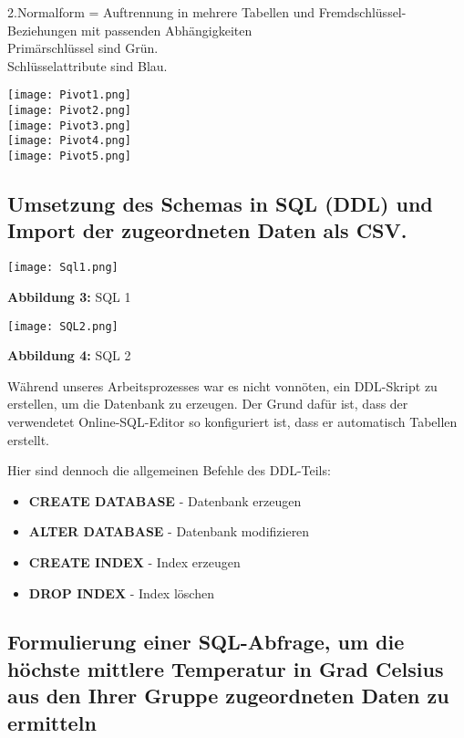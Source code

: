 \documentclass{article}
\begin{document}
2.Normalform = Auftrennung  in  mehrere  Tabellen  und  Fremdschlüssel-Beziehungen  mit passenden Abhängigkeiten\\
Primärschlüssel sind Grün. \\
Schlüsselattribute sind Blau.

\texttt{[image: Pivot1.png]}
\\

\texttt{[image: Pivot2.png]}
\\

\texttt{[image: Pivot3.png]}
\\

\texttt{[image: Pivot4.png]}
\\

\texttt{[image: Pivot5.png]}


\subsection{Umsetzung des Schemas in SQL (DDL) und Import der zugeordneten Daten als CSV.\\}

\texttt{[image: Sql1.png]}
\par \textbf{Abbildung 3:} SQL 1

\texttt{[image: SQL2.png]}
\par \textbf{Abbildung 4:} SQL 2

Während unseres Arbeitsprozesses war es nicht vonnöten, ein DDL-Skript zu erstellen, um die Datenbank zu erzeugen. Der Grund dafür ist, dass der verwendetet Online-SQL-Editor so konfiguriert ist, dass er automatisch Tabellen erstellt.

Hier sind dennoch die allgemeinen Befehle des DDL-Teils:

\begin{itemize}
    \item \textbf{CREATE DATABASE} - Datenbank erzeugen
    \item \textbf{ALTER DATABASE} - Datenbank modifizieren
    \item \textbf{CREATE INDEX} - Index erzeugen
    \item \textbf{DROP INDEX} - Index löschen
\end{itemize}

\subsection{Formulierung einer SQL-Abfrage, um die höchste mittlere Temperatur in Grad Celsius aus den
 Ihrer Gruppe zugeordneten Daten zu ermitteln\\}
\end{document}
